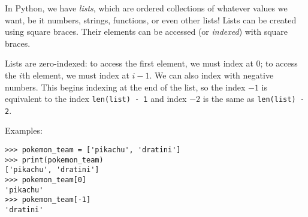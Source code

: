 In Python, we have \textit{lists}, which are ordered collections of whatever values we want, be it numbers, strings, functions, or even other lists! Lists can be created using square braces. Their elements can be accessed (or \textit{indexed}) with square braces. 

Lists are zero-indexed: to access the first element, we must index at 0;  to access the $i$th element, we must index at $i - 1$. We can also index with negative numbers. This begins indexing at the end of the list, so the index $-1$ is equivalent to the index \texttt{len(list) - 1} and index $-2$ is the same as \texttt{len(list) - 2}.

Examples:
\begin{lstlisting}
>>> pokemon_team = ['pikachu', 'dratini']
>>> print(pokemon_team)
['pikachu', 'dratini']
>>> pokemon_team[0]
'pikachu'
>>> pokemon_team[-1]
'dratini'
\end{lstlisting}
